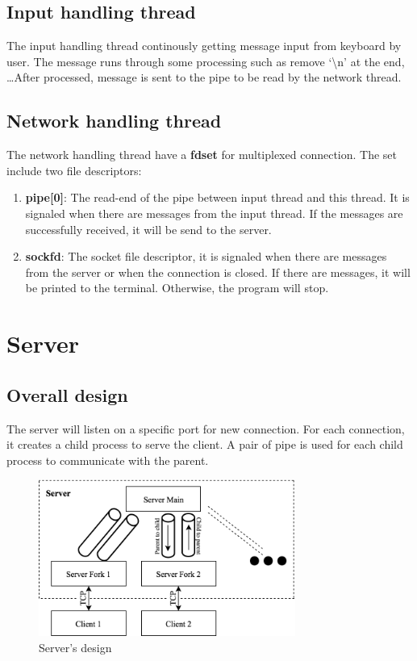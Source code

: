 \documentclass[12pt]{article}
\begin{document}
\subsection{Input handling thread}

The input handling thread continously getting message input from keyboard by user. The message runs through some processing such as remove `\textbackslash n' at the end, \dots After processed, message is sent to the pipe to be read by the network thread.

\subsection{Network handling thread}

The network handling thread have a \textbf{fdset} for multiplexed connection. The set include two file descriptors:

\begin{enumerate}
\item \textbf{pipe[0]}: The read-end of the pipe between input thread and this thread. It is signaled when there are messages from the input thread. If the messages are successfully received, it will be send to the server.

\item \textbf{sockfd}: The socket file descriptor, it is signaled when there are messages from the server or when the connection is closed. If there are messages, it will be printed to the terminal. Otherwise, the program will stop.
\end{enumerate}

\section{Server}

\subsection{Overall design}

The server will listen on a specific port for new connection. For each connection, it creates a child process to serve the client. A pair of pipe is used for each child process to communicate with the parent.

\begin{figure}[H]
\centering
\includegraphics[width=0.75\textwidth]{server_diagram.png}
\caption{Server's design}
\end{figure}
\end{document}
